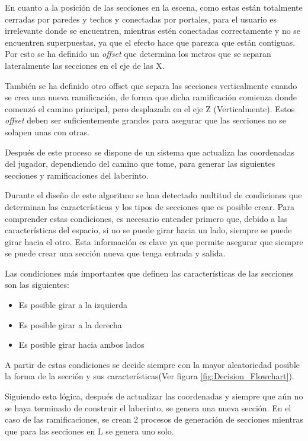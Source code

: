 \documentclass[../main.tex]{subfiles}
\begin{document}
En cuanto a la posición de las secciones en la escena, como estas están totalmente cerradas por paredes y techos y conectadas por portales, para el usuario es irrelevante donde se encuentren, mientras estén conectadas correctamente y no se encuentren superpuestas, ya que el efecto hace que parezca que están contiguas. Por esto se ha definido un \textit{offset} que determina los metros que se separan lateralmente las secciones en el eje de las X.

También se ha definido otro offset que separa las secciones verticalmente cuando se crea una nueva ramificación, de forma que dicha ramificación comienza donde comenzó el camino principal, pero desplazada en el eje Z (Verticalmente). Estos \textit{offset} deben ser suficientemente grandes para asegurar que las secciones no se solapen unas con otras.

Después de este proceso se dispone de un sistema que actualiza las coordenadas del jugador, dependiendo del camino que tome, para generar las siguientes secciones y ramificaciones del laberinto.

Durante el diseño de este algoritmo se han detectado multitud de condiciones que determinan las características y los tipos de secciones que es posible crear. Para comprender estas condiciones, es necesario entender primero que, debido a las características del espacio, si no se puede girar hacia un lado, siempre se puede girar hacia el otro. Esta información es clave ya que permite asegurar que siempre se puede crear una sección nueva que tenga entrada y salida.

Las condiciones más importantes que definen las características de las secciones son las siguientes:

\begin{itemize}
    \item Es posible girar a la izquierda
    \item Es posible girar a la derecha
    \item Es posible girar hacia ambos lados
\end{itemize}

A partir de estas condiciones se decide siempre con la mayor aleatoriedad posible la forma de la sección y sus características(Ver figura \ref{fig:Decision_Flowchart}).

Siguiendo esta lógica, después de actualizar las coordenadas y siempre que aún no se haya terminado de construir el laberinto, se genera una nueva sección. En el caso de las ramificaciones, se crean 2 procesos de generación de secciones mientras que para las secciones en L se genera uno solo.
\end{document}
